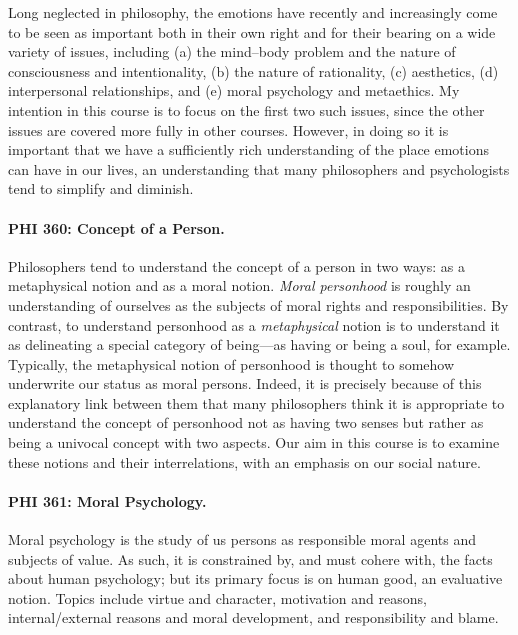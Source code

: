 \documentclass[%
  11pt,%
]{article}
\begin{document}
Long neglected in philosophy, the emotions have recently and increasingly come to be seen as important both in their own right and for their bearing on a wide variety of issues, including (a) the mind--body problem and the nature of consciousness and intentionality, (b) the nature of rationality, (c) aesthetics, (d) interpersonal relationships, and (e) moral psychology and metaethics. My intention in this course is to focus on the first two such issues, since the other issues are covered more fully in other courses. However, in doing so it is important that we have a sufficiently rich understanding of the place emotions can have in our lives, an understanding that many philosophers and psychologists tend to simplify and diminish.

\paragraph{PHI 360: Concept of a Person.}

Philosophers tend to understand the concept of a person in two ways: as a metaphysical notion and as a moral notion. \emph{Moral personhood} is roughly an understanding of ourselves as the subjects of moral rights and responsibilities. By contrast, to understand personhood as a \emph{metaphysical} notion is to understand it as delineating a special category of being---as having or being a soul, for example. Typically, the metaphysical notion of personhood is thought to somehow underwrite our status as moral persons. Indeed, it is precisely because of this explanatory link between them that many philosophers think it is appropriate to understand the concept of personhood not as having two senses but rather as being a univocal concept with two aspects. Our aim in this course is to examine these notions and their interrelations, with an emphasis on our social nature.

\paragraph{PHI 361: Moral Psychology.}

Moral psychology is the study of us persons as responsible moral agents and subjects of value. As such, it is constrained by, and must cohere with, the facts about human psychology; but its primary focus is on human good, an evaluative notion. Topics include virtue and character, motivation and reasons, internal/external reasons and moral development, and responsibility and blame.
\end{document}
